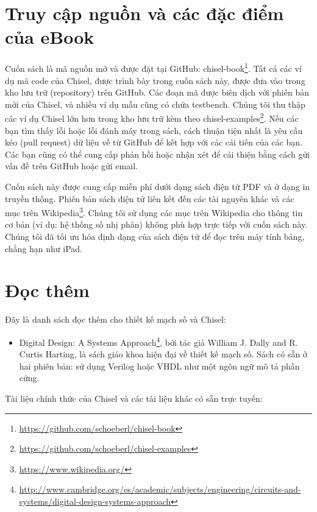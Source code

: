 \documentclass[%
    10pt,
    headinclude, footexclude,
    openright, %
    notitlepage,
    cleardoubleempty,
    headsepline,
    pointlessnumbers,
    bibtotoc, idxtotoc,
    ]{scrbook}
\newcommand{\myref}[2]{\href{#1}{#2}}
\renewcommand{\myref}[2]{{#2}{\footnote{\url{#1}}}}
\begin{document}
\section{Truy cập nguồn và các đặc điểm của eBook}

Cuốn sách là mã nguồn mở và được đặt tại GitHub: \myref{https://github.com/schoeberl/chisel-book}{chisel-book}.
Tất cả các ví dụ mã code của Chisel, được trình bày trong cuốn sách này, được đưa vào trong kho lưu trữ (repository) trên GitHub.
Các đoạn mã được biên dịch với phiên bản mới của Chisel, và nhiều ví dụ mẫu cũng có chứa testbench.
Chúng tôi thu thập các ví dụ Chisel lớn hơn trong kho lưu trữ kèm theo \myref{https://github.com/schoeberl/chisel-examples}{chisel-examples}. Nếu các bạn tìm thấy lỗi hoặc lỗi đánh máy trong sách, cách thuận tiện nhất là yêu cầu kéo (pull request) dữ liệu về từ GitHub để kết hợp với các cải tiến của các bạn.
Các bạn cũng có thể cung cấp phản hồi hoặc nhận xét để cải thiện bằng cách gửi vấn đề trên GitHub hoặc gửi email.


Cuốn sách này được cung cấp miễn phí dưới dạng sách điện tử PDF và ở dạng in truyền thống.
Phiên bản sách điện tử liên kết đến các tài nguyên khác
và các mục trên \myref{https://www.wikipedia.org/}{Wikipedia}.
Chúng tôi sử dụng các mục trên Wikipedia cho thông tin cơ bản (ví dụ: hệ thống số nhị phân) không phù hợp trực tiếp với cuốn sách này.
Chúng tôi đã tối ưu hóa định dạng của sách điện tử để đọc trên máy tính bảng, chẳng hạn như iPad.

\section{Đọc thêm}

Đây là danh sách đọc thêm cho thiết kế mạch số và Chisel:
\begin{itemize}
\item \myref{http://www.cambridge.org/es/academic/subjects/engineering/circuits-and-systems/digital-design-systems-approach}{Digital Design: A Systems Approach}, bởi tác giả William J. Dally and R. Curtis Harting,
là sách giáo khoa hiện đại về thiết kế mạch số. Sách có sẵn ở hai phiên bản: sử dụng Verilog hoặc VHDL như một ngôn ngữ mô tả phần cứng.
\end{itemize}

Tài liệu chính thức của Chisel và các tài liệu khác có sẵn trực tuyến:
\end{document}
